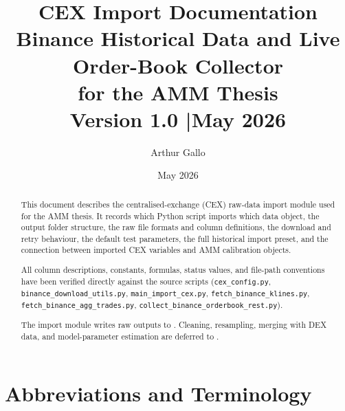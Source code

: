 \documentclass[11pt,a4paper]{article}
\title{\textbf{CEX Import Documentation}\\
\large Binance Historical Data and Live Order-Book Collector\\
for the AMM Thesis\\[4pt]
\normalsize Version 1.0 \quad|\quad May 2026}
\author{Arthur Gallo}
\date{May 2026}
\begin{document}
\maketitle
\thispagestyle{fancy}

\begin{abstract}
This document describes the centralised-exchange (CEX) raw-data import
module used for the AMM thesis. It records which Python script imports
which data object, the output folder structure, the raw file formats
and column definitions, the download and retry behaviour, the default
test parameters, the full historical import preset, and the connection
between imported CEX variables and AMM calibration objects.

All column descriptions, constants, formulas, status values, and
file-path conventions have been verified directly against the source
scripts (\texttt{cex\_config.py}, \texttt{binance\_download\_utils.py},
\texttt{main\_import\_cex.py}, \texttt{fetch\_binance\_klines.py},
\texttt{fetch\_binance\_agg\_trades.py},
\texttt{collect\_binance\_orderbook\_rest.py}).

The import module writes raw outputs to
. Cleaning,
resampling, merging with DEX data, and model-parameter estimation
are deferred to .
\end{abstract}

\tableofcontents
\newpage

\section{Abbreviations and Terminology}
\label{sec:glossary}
\end{document}

